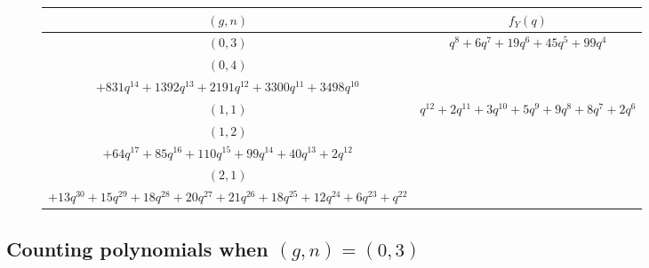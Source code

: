 \documentclass[12pt]{amsart}
\theoremstyle{plain}
\theoremstyle{definition}
\theoremstyle{remark}
\newcommand{\bY}{{Y}}
\newcommand{\Fq}{\mathbb{F}_q}
\newcommand{\fg}{\mathfrak{g}}
\begin{document}
\begin{figure}[h] 
\centering
\begin{tabular}{|c|c|} 
\hline
$(g,n)$ & $f_Y(q)$ \\
\hline
$(0,3)$ & $q^8+6q^7+19q^6+45q^5+99q^4$ \\
\hline
$(0,4)$ & \makecell{$q^{20}+8q^{19}+33q^{18}+96q^{17}+225q^{16}+456q^{15}$ \\
$+831q^{14}+1392q^{13}+2191q^{12}+3300q^{11}+3498q^{10}$
} \\
\hline
$(1,1)$ & $q^{12}+2q^{11}+3q^{10}+5q^9+9q^8+8q^7+2q^6$ \\
\hline
$(1,2)$ & \makecell{$q^{24}+4q^{23}+9q^{22}+16q^{21}+25q^{20}+36q^{19}+49q^{18}$ \\
$+64q^{17}+85q^{16}+110q^{15}+99q^{14}+40q^{13}+2q^{12}$} \\
\hline
$(2,1)$ & \makecell{$q^{40}+2q^{39}+3q^{38}+4q^{37}+5q^{36}+6q^{35}+7q^{34}+8q^{33}+9q^{32}+11q^{31}$ \\
$+13q^{30}+15q^{29}+18q^{28}+20q^{27}+21q^{26}+18q^{25}+12q^{24}+6q^{23}+q^{22}$} \\
\hline
\end{tabular}
\label{figure:addg2}
\end{figure}
























\newpage 
\subsection{Counting polynomials when $(g,n)=(0,3)$}\label{ss:nonneg}
\mbox{}\\
\end{document}
